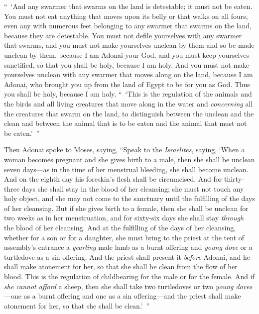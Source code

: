 \begin{biblechapter}
\verse “ ‘And any swarmer that swarms on the land is detestable; it must not be eaten.
\verse You must not eat anything that moves upon its belly or that walks on all fours, even any with numerous feet belonging to any swarmer that swarms on the land, because they are detestable.
\verse You must not defile yourselves with any swarmer that swarms, and you must not make yourselves unclean by them and so be made unclean by them,
\verse because I am Adonai your God, and you must keep yourselves sanctified, so that you shall be holy, because I am holy. And you must not make yourselves unclean with any swarmer that moves along on the land,
\verse because I am Adonai, who brought you up from the land of Egypt to be for you as God. Thus you shall be holy, because I am holy.
\verse “ ‘This is the regulation of the animals and the birds and all living creatures that move along in the water and \textit{concerning} all the creatures that swarm on the land,
\verse to distinguish between the unclean and the clean and between the animal that is to be eaten and the animal that must not be eaten.’ ”
\end{biblechapter}

\begin{biblechapter} %
 Then Adonai spoke to Moses, saying,
\verse “Speak to the \textit{Israelites}, saying, ‘When a woman becomes pregnant and she gives birth to a male, then she shall be unclean seven days—as in the time of her menstrual bleeding, she shall become unclean.
\verse And on the eighth day his foreskin’s flesh shall be circumcised.
\verse And for thirty-three days she shall stay in the blood of her cleansing; she must not touch any holy object, and she may not come to the sanctuary until the fulfilling of the days of her cleansing.
\verse But if she gives birth to a female, then she shall be unclean for two weeks as in her menstruation, and for sixty-six days she shall stay \textit{through} the blood of her cleansing.
\verse And at the fulfilling of the days of her cleansing, whether for a son or for a daughter, she must bring to the priest at the tent of assembly’s entrance a \textit{yearling} male lamb as a burnt offering and \textit{young dove} or a turtledove as a sin offering.
\verse And the priest shall present it \textit{before} Adonai, and he shall make atonement for her, so that she shall be clean from the flow of her blood. This is the regulation of childbearing for the male or for the female.
\verse And if \textit{she cannot afford} a sheep, then she shall take two turtledoves or two \textit{young doves}—one as a burnt offering and one as a sin offering—and the priest shall make atonement for her, so that she shall be clean.’ ”
\end{biblechapter}

